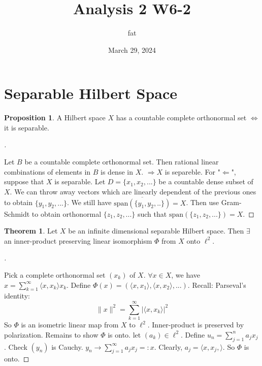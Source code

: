 \documentclass{article}
\title{Analysis 2 W6-2}
\author{fat}
\date{March 29, 2024}
\theoremstyle{definition}
\newtheorem{thm}{Theorem}
\newtheorem{prop}{Proposition}
\newenvironment{proofs}[1][\proofname]{%
  \begin{proof}[#1]$ $\par\nobreak\ignorespaces
}{%
  \end{proof}
}
\begin{document}
\maketitle
\thispagestyle{fancy}
\renewcommand{\footrulewidth}{0.4pt}
\cfoot{\thepage}
\renewcommand{\headrulewidth}{0.4pt}

\section{Separable Hilbert Space}

\begin{prop}
	A Hilbert space $X$ has a countable complete orthonormal set $\Leftrightarrow$ it is separable.
\end{prop}

\begin{proofs}
	Let $B$ be a countable complete orthonormal set.
	Then rational linear combinations of elements in $B$ is dense in $X$.
	$\Rightarrow X$ is separeble.
	For "$\Leftarrow$", suppose that $X$ is separable.
	Let $D = \{x_1, x_2, ... \}$ be a countable dense subset of $X$.
	We can throw away vectors which are linearly dependent of the previous ones to obtain $\{y_1, y_2, ...\}$.
	We still have $\overline{\text{span}(\{y_1, y_2, ..\})} = X$.
	Then use Gram-Schmidt to obtain orthonormal $\{z_1, z_2, ...\}$ such that $\text{span}(\{z_1, z_2, ...\}) = X$.
\end{proofs}

\begin{thm}
	Let $X$ be an infinite dimensional separable Hilbert space.
	Then $\exists$ an inner-product preserving linear isomorphism $\Phi$ from $X$ onto $\ell^2$.
\end{thm}

\begin{proofs}
	Pick a complete orthonormal set $(x_k)$ of $X$.
	$\forall x \in X$, we have $x = \sum_{k = 1}^\infty \langle x, x_k \rangle x_k$.
	Define $\Phi(x) = (\langle x, x_1 \rangle, \langle x, x_2 \rangle, ...)$.
	Recall: Parseval's identity:
	\[
		\|x\|^2 = \sum_{k = 1}^\infty |\langle x, x_k \rangle|^2
	\]
	So $\Phi$ is an isometric linear map from $X$ to $\ell^2$.
	Inner-product is preserved by polarization.
	Remains to show $\Phi$ is onto.
	let $(a_k) \in \ell^2$.
	Define $u_n = \sum_{j = 1}^n a_j x_j$.
	Check $(y_n)$ is Cauchy.
	$y_n \to \sum_{j = 1}^\infty a_j x_j =: x$.
	Clearly, $a_j = \langle x, x_j, \rangle$.
	So $\Phi$ is onto.
\end{proofs}
\end{document}
